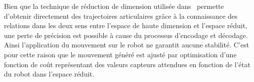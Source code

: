 Bien que la technique de réduction de dimension utilisée dans~\cite{chalodhorn09} permette
d'obtenir directement des trajectoires articulaires gr\^ace à la connaissance des relations dans les deux
sens entre l'espace de haute dimension et l'espace réduit, une perte de précision
est possible à cause du processus d'encodage et décodage.
Ainsi l'application du mouvement sur le robot ne garantit aucune stabilité. C'est pour 
cette raison que le mouvement généré est ajusté par optimisation d'une fonction de coût
représentant des valeurs capteurs attendues en fonction de l'état du robot 
dans l'espace réduit. 

